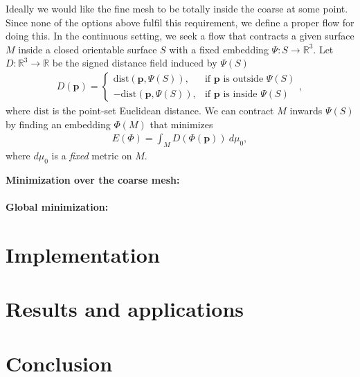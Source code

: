 \documentclass{acmtog}
\begin{document}
Ideally we would like the fine mesh to be totally inside the coarse at some point. Since none of the options above fulfil this requirement, we define a proper flow for doing this. In the continuous setting, we seek a flow that contracts a given surface $M$ inside a closed orientable surface $S$ with a fixed embedding $\Psi: S \to \mathbb{R}^3$. Let $D: \mathbb{R}^3 \to \mathbb{R}$ be the signed distance field induced by $\Psi(S)$
\begin{align}
D(\mathbf{p}) = \left\{ \begin{array}{rl} 
\mathrm{dist}(\mathbf{p},\Psi(S)), & \mbox{if } \mathbf{p} \mbox{ is outside } \Psi(S) \\
-\mathrm{dist}(\mathbf{p},\Psi(S)), & \mbox{if } \mathbf{p} \mbox{ is inside } \Psi(S)
\end{array}
\right. ,
\end{align}
where $\mathrm{dist}$ is the point-set Euclidean distance. We can contract $M$ inwards $\Psi(S)$ by finding an embedding $\Phi(M)$ that minimizes
\begin{align}
E(\Phi) = \int_M D(\Phi(\mathbf{p}))\ d \mu_0,
\end{align} 
where $d \mu_0$ is a \emph{fixed} metric on $M$.

\textbf{Minimization over the coarse mesh:}\\
\\
\textbf{Global minimization:}

\section{Implementation}
\label{sec:implementation}

\section{Results and applications}
\label{sec:results}

\section{Conclusion}
\label{sec:colnclusion}

\begin{acks}
\end{acks}





\end{document}
